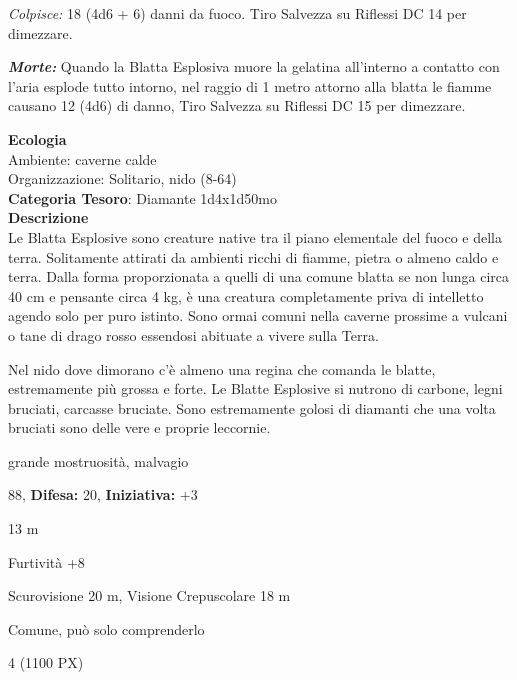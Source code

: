 \begin{multicols}{2}
{\emph{Colpisce:} 18 (4d6 + 6) danni da fuoco. Tiro Salvezza su Riflessi DC 14 per dimezzare.

\emph{\textbf{Morte:}} Quando la Blatta Esplosiva muore la gelatina all'interno a contatto con l'aria esplode tutto intorno, nel raggio di 1 metro attorno alla blatta le fiamme causano 12 (4d6) di danno, Tiro Salvezza su Riflessi DC 15 per dimezzare.

\textbf{Ecologia}\\
Ambiente: caverne calde\\
Organizzazione: Solitario, nido (8-64)\\
\textbf{Categoria Tesoro}: Diamante 1d4x1d50mo\\
\textbf{Descrizione}\\
Le Blatta Esplosive sono creature native tra il piano elementale del fuoco e della terra. Solitamente attirati da ambienti ricchi di fiamme, pietra o almeno caldo e terra.
Dalla forma proporzionata a quelli di una comune blatta se non lunga circa 40 cm e pensante circa 4 kg, è una creatura completamente priva di intelletto agendo solo per puro istinto.
Sono ormai comuni nella caverne prossime a vulcani o tane di drago rosso essendosi abituate a vivere sulla Terra.

Nel nido dove dimorano c'è almeno una regina che comanda le blatte, estremamente più grossa e forte. Le Blatte Esplosive si nutrono di carbone, legni bruciati, carcasse bruciate. Sono estremamente golosi di diamanti che una volta bruciati sono delle vere e proprie leccornie.

\noindent
\begin{description}[noitemsep, topsep=0pt, parsep=0pt, partopsep=0pt, leftmargin=0cm, labelwidth=2.2cm]
	\item[\textbf{Taglia/Tipo:}] grande mostruosità, malvagio
	\item[\textbf{Caratt.:}] 
	\item[\textbf{Punti Ferita:}] 88,  \textbf{Difesa:} 20,  \textbf{Iniziativa:} +3
	\item[\textbf{Movimento:}] 13 m
	\item[\textbf{Tiri Salvez.:}] 
	\item[\textbf{Comp.:}] Furtività +8
	\item[\textbf{Sensi:}] Scurovisione 20 m, Visione Crepuscolare 18 m
	\item[\textbf{Linguaggi:}] Comune, può solo comprenderlo
	\item[\textbf{Sfida:}] 4 (1100 PX)\smallskip
\end{description}

}
\end{multicols}
